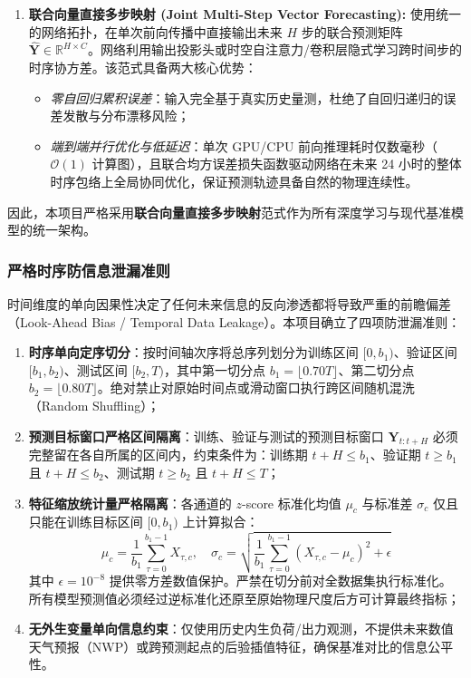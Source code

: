 \begin{enumerate}
    \item \textbf{联合向量直接多步映射 (Joint Multi-Step Vector Forecasting):}
    使用统一的网络拓扑，在单次前向传播中直接输出未来 $H$ 步的联合预测矩阵 $\hat{\mathbf{Y}} \in \mathbb{R}^{H \times C}$。网络利用输出投影头或时空自注意力/卷积层隐式学习跨时间步的时序协方差。该范式具备两大核心优势：
    \begin{itemize}
        \item \textit{零自回归累积误差}：输入完全基于真实历史量测，杜绝了自回归递归的误差发散与分布漂移风险；
        \item \textit{端到端并行优化与低延迟}：单次 GPU/CPU 前向推理耗时仅数毫秒（$\mathcal{O}(1)$ 计算图），且联合均方误差损失函数驱动网络在未来 24 小时的整体时序包络上全局协同优化，保证预测轨迹具备自然的物理连续性。
    \end{itemize}
\end{enumerate}
因此，本项目严格采用\textbf{联合向量直接多步映射}范式作为所有深度学习与现代基准模型的统一架构。

\subsubsection{严格时序防信息泄漏准则}
时间维度的单向因果性决定了任何未来信息的反向渗透都将导致严重的前瞻偏差（Look-Ahead Bias / Temporal Data Leakage）。本项目确立了四项防泄漏准则：
\begin{enumerate}
    \item \textbf{时序单向定序切分}：按时间轴次序将总序列划分为训练区间 $[0, b_1)$、验证区间 $[b_1, b_2)$、测试区间 $[b_2, T)$，其中第一切分点 $b_1 = \lfloor 0.70 T \rfloor$、第二切分点 $b_2 = \lfloor 0.80 T \rfloor$。绝对禁止对原始时间点或滑动窗口执行跨区间随机混洗（Random Shuffling）；
    \item \textbf{预测目标窗口严格区间隔离}：训练、验证与测试的预测目标窗口 $\mathbf{Y}_{t:t+H}$ 必须完整留在各自所属的区间内，约束条件为：训练期 $t+H \le b_1$、验证期 $t \ge b_1$ 且 $t+H \le b_2$、测试期 $t \ge b_2$ 且 $t+H \le T$；
    \item \textbf{特征缩放统计量严格隔离}：各通道的 $z$-score 标准化均值 $\mu_c$ 与标准差 $\sigma_c$ 仅且只能在训练目标区间 $[0, b_1)$ 上计算拟合：
    \begin{equation}
        \mu_c = \frac{1}{b_1} \sum_{\tau=0}^{b_1-1} X_{\tau, c}, \quad \sigma_c = \sqrt{\frac{1}{b_1} \sum_{\tau=0}^{b_1-1} (X_{\tau, c} - \mu_c)^2 + \epsilon}
    \end{equation}
    其中 $\epsilon = 10^{-8}$ 提供零方差数值保护。严禁在切分前对全数据集执行标准化。所有模型预测值必须经过逆标准化还原至原始物理尺度后方可计算最终指标；
    \item \textbf{无外生变量单向信息约束}：仅使用历史内生负荷/出力观测，不提供未来数值天气预报（NWP）或跨预测起点的后验插值特征，确保基准对比的信息公平性。
\end{enumerate}

